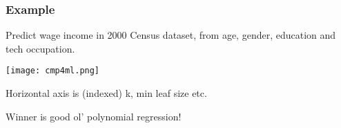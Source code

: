 \documentclass{beamer}
\begin{document}
\begin{frame} 
\frametitle{Example}
\pause

Predict wage income in 2000 Census dataset, from age, gender, education and
tech occupation.

\texttt{[image: cmp4ml.png]}

Horizontal axis is (indexed) k, min leaf size etc.

Winner is good ol' polynomial regression!

\end{frame} 
\end{document}
